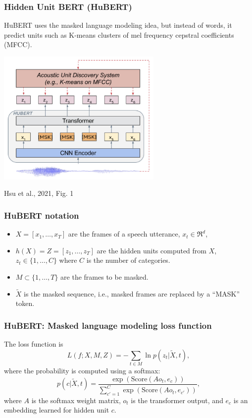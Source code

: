 \documentclass{beamer}
\begin{document}
\begin{frame}
  \frametitle{Hidden Unit BERT (HuBERT)}

  HuBERT uses the masked language modeling idea, but instead of words,
  it predict units such as K-means clusters of mel frequency cepstral
  coefficients (MFCC).
  \centerline{\includegraphics[width=0.6\textwidth]{figs/hsu2021fig1.png}}
  \centerline{\tiny Hsu et al., 2021, Fig. 1}
\end{frame}

\begin{frame}
  \frametitle{HuBERT notation}

  \begin{itemize}
  \item $X=[x_1,\ldots,x_T]$ are the frames of a speech utterance,
    $x_t\in\Re^d$,
  \item $h(X)=Z=[z_1,\ldots,z_T]$ are the hidden units computed from
    $X$, $z_t\in\{1,\ldots,C\}$ where $C$ is the number of categories.
  \item $M\subset\{1,\ldots,T\}$ are the frames to be masked.
  \item $\tilde{X}$ is the masked sequence, i.e., masked frames are
    replaced by a ``MASK'' token.
  \end{itemize}
\end{frame}

\begin{frame}
  \frametitle{HuBERT: Masked language modeling loss function}

  The loss function is
  \begin{displaymath}
    L(f;X,M,Z) = -\sum_{t\in M} \ln p(z_t|\tilde{X},t),
  \end{displaymath}
  where the probability is computed using a softmax:
  \begin{displaymath}
    p(c|\tilde{X},t) = \frac{\exp\left(\text{Score}(Ao_t,e_c)\right)}{\sum_{c'=1}^C\exp\left(\text{Score}(Ao_t,e_{c'})\right)},
  \end{displaymath}
  where $A$ is the softmax weight matrix, $o_t$ is the transformer
  output, and $e_c$ is an embedding learned for hidden unit $c$.
\end{frame}
\end{document}
